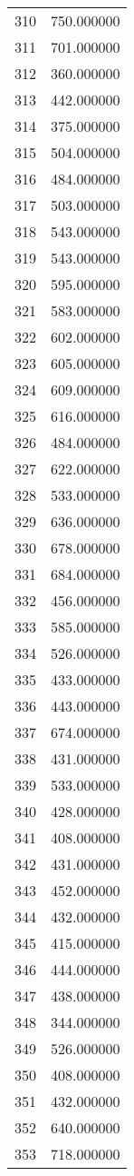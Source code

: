 \documentclass[12pt]{article}
\begin{document}
\begin{longtable}{@{}cc@{}}
310 & 750.000000 \\
311 & 701.000000 \\
312 & 360.000000 \\
313 & 442.000000 \\
314 & 375.000000 \\
315 & 504.000000 \\
316 & 484.000000 \\
317 & 503.000000 \\
318 & 543.000000 \\
319 & 543.000000 \\
320 & 595.000000 \\
321 & 583.000000 \\
322 & 602.000000 \\
323 & 605.000000 \\
324 & 609.000000 \\
325 & 616.000000 \\
326 & 484.000000 \\
327 & 622.000000 \\
328 & 533.000000 \\
329 & 636.000000 \\
330 & 678.000000 \\
331 & 684.000000 \\
332 & 456.000000 \\
333 & 585.000000 \\
334 & 526.000000 \\
335 & 433.000000 \\
336 & 443.000000 \\
337 & 674.000000 \\
338 & 431.000000 \\
339 & 533.000000 \\
340 & 428.000000 \\
341 & 408.000000 \\
342 & 431.000000 \\
343 & 452.000000 \\
344 & 432.000000 \\
345 & 415.000000 \\
346 & 444.000000 \\
347 & 438.000000 \\
348 & 344.000000 \\
349 & 526.000000 \\
350 & 408.000000 \\
351 & 432.000000 \\
352 & 640.000000 \\
353 & 718.000000 \\

\end{longtable}
\end{document}
